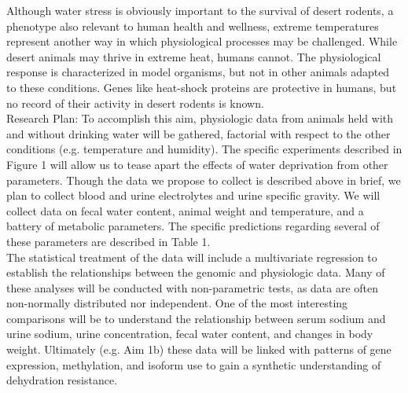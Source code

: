 \documentclass[12pt]{article}
\begin{document}
Although water stress is obviously important to the survival of desert rodents, a phenotype also relevant to human health and wellness, extreme temperatures represent another way in which physiological processes may be challenged. While desert animals may thrive in extreme heat, humans cannot. The physiological response is characterized in model organisms, but not in other animals adapted to these conditions. Genes like heat-shock proteins are protective in humans, but no record of their activity in desert rodents is known. \\

Research Plan: To accomplish this aim, physiologic data from animals held with and without drinking water will be gathered, factorial with respect to the other conditions (e.g. temperature and humidity). The specific experiments described in \hypertarget{Figure 1}{Figure 1} will allow us to tease apart the effects of water deprivation from other parameters. Though the data we propose to collect is described above in brief, we plan to collect blood and urine electrolytes and urine specific gravity. We will collect data on fecal water content, animal weight and temperature, and a battery of metabolic parameters. The specific predictions regarding several of these parameters are described in Table 1.  \\

The statistical treatment of the data will include a multivariate regression to establish the relationships between the genomic and physiologic data. Many of these analyses will be conducted with non-parametric tests, as data are often non-normally distributed nor independent. One of the most interesting comparisons will be to understand the relationship between serum sodium and urine sodium, urine concentration, fecal water content, and changes in body weight. Ultimately (e.g. Aim 1b) these data will be linked with patterns of gene expression, methylation, and isoform use to gain a synthetic understanding of dehydration resistance. \\




%
%
\end{document}
